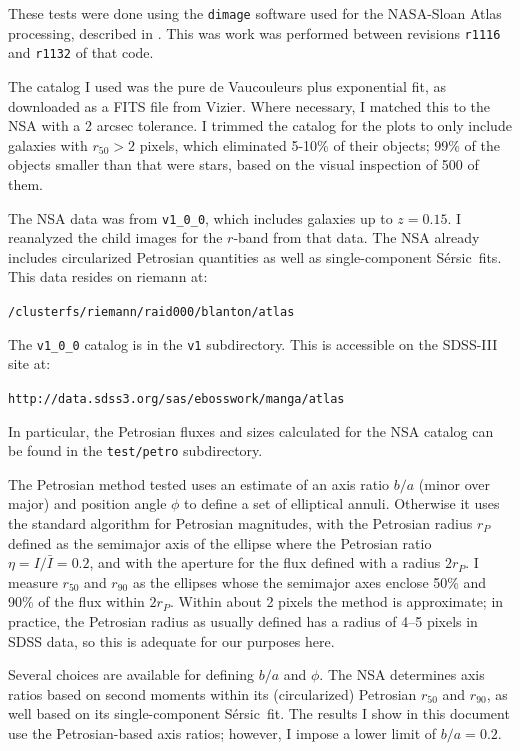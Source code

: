 \documentclass[10pt,preprint]{aastex}
\newcommand{\Sersic}{S\'ersic}
\begin{document}
These tests were done using the {\tt dimage} software used for the
NASA-Sloan Atlas processing, described in \citet{blanton11a}. This was
work was performed between revisions {\tt r1116} and {\tt r1132} of
that code.

The \citet{simard11a} catalog I used was the pure de Vaucouleurs plus
exponential fit, as downloaded as a FITS file from Vizier. Where
necessary, I matched this to the NSA with a 2 arcsec tolerance. I
trimmed the \citet{simard11a} catalog for the plots to only include
galaxies with $r_{50}>2$ pixels, which eliminated 5-10\% of their
objects; 99\% of the objects smaller than that were stars, based on
the visual inspection of 500 of them.

The NSA data was from {\tt v1\_0\_0}, which includes galaxies up to
$z=0.15$. I reanalyzed the child images for the $r$-band from that
data. The NSA already includes circularized Petrosian quantities as
well as single-component \Sersic\ fits. This data resides on riemann
at:
\begin{center}
{\tt /clusterfs/riemann/raid000/blanton/atlas} 
\end{center}
The {\tt v1\_0\_0} catalog is in the {\tt v1} subdirectory. This is
accessible on the SDSS-III site at:
\begin{center}
{\tt http://data.sdss3.org/sas/ebosswork/manga/atlas}
\end{center}
In particular, the Petrosian fluxes and sizes calculated for the NSA
catalog can be found in the {\tt test/petro} subdirectory.

The Petrosian method tested uses an estimate of an axis ratio $b/a$
(minor over major) and position angle $\phi$ to define a set of
elliptical annuli. Otherwise it uses the standard algorithm for
Petrosian magnitudes, with the Petrosian radius $r_P$ defined as the
semimajor axis of the ellipse where the Petrosian ratio $\eta= I/\bar
I = 0.2$, and with the aperture for the flux defined with a radius
$2r_P$. I measure $r_{50}$ and $r_{90}$ as the ellipses whose the
semimajor axes enclose 50\% and 90\% of the flux within $2r_P$. Within
about 2 pixels the method is approximate; in practice, the Petrosian
radius as usually defined has a radius of 4--5 pixels in SDSS data, so
this is adequate for our purposes here.

Several choices are available for defining $b/a$ and $\phi$. The NSA
determines axis ratios based on second moments within its
(circularized) Petrosian $r_{50}$ and $r_{90}$, as well based on its
single-component \Sersic\ fit. The results I show in this document use
the Petrosian-based axis ratios; however, I impose a lower limit of
$b/a=0.2$.
\end{document}
